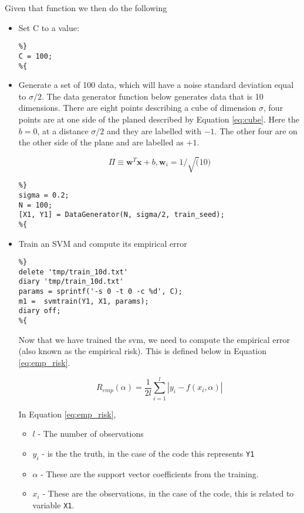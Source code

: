\documentclass[11pt, twoside]{article}   	%
\begin{document}
Given that function we then do the following
\begin{itemize}
\item Set C to a value: 
\begin{lstlisting}
%}
C = 100; 
%{
\end{lstlisting}
\item Generate a set of 100 data, which will have a noise standard
deviation equal to $\sigma/2$. The data generator function below generates
data that is 10 dimensions. There are eight points describing a cube 
of dimension $\sigma$, four points are at one side of the planed described by
Equation \ref{eq:cube}. Here the $b=0$, at a distance $\sigma/2$ and they are
labelled with $-1$. The other four are on the other side of the plane and are labelled
as $+1$. 

\begin{equation}
\Pi \equiv \mathbf{w}^T\mathbf{x} + b , \mathbf{w}_i = 1/\sqrt(10)
\label{eq:cube}
\end{equation}
 
\begin{lstlisting}
%}
sigma = 0.2; 
N = 100; 
[X1, Y1] = DataGenerator(N, sigma/2, train_seed); 
%{
\end{lstlisting}  

\item Train an SVM and compute its empirical error
\begin{lstlisting}
%}
delete 'tmp/train_10d.txt'
diary 'tmp/train_10d.txt'
params = sprintf('-s 0 -t 0 -c %d', C); 
m1 =  svmtrain(Y1, X1, params);
diary off; 
%{
\end{lstlisting} 

\color{lightgray}
\color{black}

Now that we have trained the svm, we need to compute the empirical error (also known as the
empirical risk). This is defined below in Equation \ref{eq:emp_risk}. 

\begin{equation}
R_{emp}(\alpha) = \frac{1}{2l} \sum\limits_{i=1}^l|y_i - f(x_i, \alpha)|
\label{eq:emp_risk}
\end{equation}

In Equation \ref{eq:emp_risk},
\begin{itemize}
\item $l$ - The number of observations
\item $y_i$ - is the the truth, in the case of the code this represents 
\texttt{Y1}
\item $\alpha$ - These are the support vector coefficients from the
training. 
\item $x_i$ - These are the observations, in the case of the code, this is
related to variable \texttt{X1}. 
\end{itemize}


\end{itemize}
\end{document}

